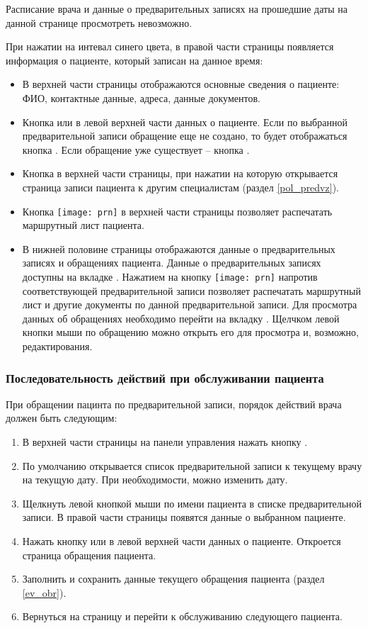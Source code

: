 Расписание врача и данные о предварительных записях на прошедшие даты на данной странице просмотреть невозможно.

При нажатии на интевал синего цвета, в правой части страницы появляется информация о пациенте, который записан на данное время:
\begin{itemize}
	\item В верхней части страницы отображаются основные сведения о пациенте: ФИО, контактные данные, адреса, данные документов.
	\item Кнопка  или  в левой верхней части данных о пациенте. Если по выбранной предварительной записи обращение еще не создано, то будет отображаться кнопка  . Если обращение уже существует -- кнопка . 
	\item Кнопка  в верхней части страницы, при нажатии на которую открывается страница записи пациента к другим специалистам (раздел \ref{pol_predvz}).
	\item Кнопка  \texttt{[image: prn]} в верхней части страницы позволяет распечатать маршрутный лист пациента.
	\item В нижней половине страницы отображаются данные о предварительных записях и обращениях пациента. Данные о предварительных записях доступны на вкладке  . Нажатием на кнопку \texttt{[image: prn]} напротив соответствующей предварительной записи позволяет распечатать маршрутный лист и другие документы по данной предварительной записи. Для просмотра данных об обращениях необходимо перейти на вкладку . Щелчком левой кнопки мыши по обращению можно открыть его для просмотра и, возможно, редактирования.
\end{itemize}  

\subsubsection{Последовательность действий при обслуживании пациента}

При обращении пацинта по предварительной записи, порядок действий врача должен быть следующим:
\begin{enumerate}
	\item В верхней части страницы на панели управления нажать кнопку .
	\item По умолчанию открывается список предварительной записи к текущему врачу на текущую дату. При необходимости, можно изменить дату.
	\item Щелкнуть левой кнопкой мыши по имени пациента в списке предварительной записи. В правой части страницы появятся данные о выбранном пациенте.
	\item Нажать кнопку  или  в левой верхней части данных о пациенте. Откроется страница обращения пациента.
	\item Заполнить и сохранить данные текущего обращения пациента (раздел \ref{ev_obr}).
	\item Вернуться на страницу  и перейти к обслуживанию следующего пациента.
\end{enumerate}

